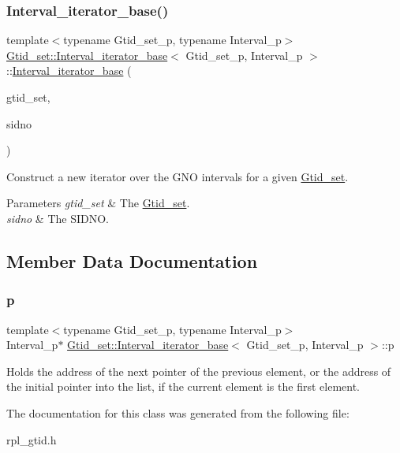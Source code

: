 \subsubsection{\texorpdfstring{Interval\+\_\+iterator\+\_\+base()}{Interval\_iterator\_base()}}
{\footnotesize\ttfamily template$<$typename Gtid\+\_\+set\+\_\+p, typename Interval\+\_\+p$>$ \\
\mbox{\hyperlink{classGtid__set_1_1Interval__iterator__base}{Gtid\+\_\+set\+::\+Interval\+\_\+iterator\+\_\+base}}$<$ Gtid\+\_\+set\+\_\+p, Interval\+\_\+p $>$\+::\mbox{\hyperlink{classGtid__set_1_1Interval__iterator__base}{Interval\+\_\+iterator\+\_\+base}} (\begin{DoxyParamCaption}\item[{Gtid\+\_\+set\+\_\+p}]{gtid\+\_\+set,  }\item[{rpl\+\_\+sidno}]{sidno }\end{DoxyParamCaption})\hspace{0.3cm}{\ttfamily [inline]}}

Construct a new iterator over the G\+NO intervals for a given \mbox{\hyperlink{classGtid__set}{Gtid\+\_\+set}}.


\begin{DoxyParams}{Parameters}
{\em gtid\+\_\+set} & The \mbox{\hyperlink{classGtid__set}{Gtid\+\_\+set}}. \\
\hline
{\em sidno} & The S\+I\+D\+NO. \\
\hline
\end{DoxyParams}


\subsection{Member Data Documentation}
\mbox{\label{classGtid__set_1_1Interval__iterator__base_ab8609fb05e3782e8a73e496d35cbc217}} 
\subsubsection{\texorpdfstring{p}{p}}
{\footnotesize\ttfamily template$<$typename Gtid\+\_\+set\+\_\+p, typename Interval\+\_\+p$>$ \\
Interval\+\_\+p$\ast$ \mbox{\hyperlink{classGtid__set_1_1Interval__iterator__base}{Gtid\+\_\+set\+::\+Interval\+\_\+iterator\+\_\+base}}$<$ Gtid\+\_\+set\+\_\+p, Interval\+\_\+p $>$\+::p\hspace{0.3cm}{\ttfamily [protected]}}

Holds the address of the \textquotesingle{}next\textquotesingle{} pointer of the previous element, or the address of the initial pointer into the list, if the current element is the first element. 

The documentation for this class was generated from the following file\+:\begin{DoxyCompactItemize}
\item 
rpl\+\_\+gtid.\+h\end{DoxyCompactItemize}
